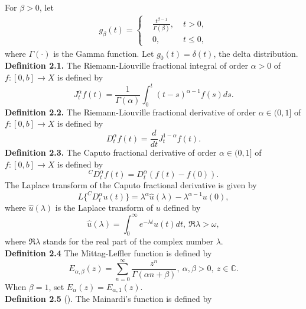 \documentclass[12pt,a4paper,oneside,reqno,notitlepage]{amsart}
\theoremstyle{plain}
\numberwithin{equation}{section}
\begin{document}
For $\beta>0$, let
\begin{eqnarray}
g_\beta(t)=\left\{\begin{aligned}
&\frac{t^{\beta-1}}{\Gamma(\beta)},\;&
t>0,\\
&0,\; &t\leq 0,
\end{aligned}\right.
\end{eqnarray}
where $\Gamma(\cdot)$ is the Gamma function. Let
$g_{0}(t)=\delta(t)$, the delta distribution.\\
\textbf{Definition 2.1.} The Riemann-Liouville fractional integral
of order $\alpha>0$ of $f:[0,b]\rightarrow X$ is defined by
\begin{equation}\label{0}
J_{t}^{\alpha}f(t)=\frac{1}{\Gamma(\alpha)}\int_{0}^{t}(t-s)^{\alpha-1}f(s)ds.
\end{equation}
\textbf{Definition 2.2.} The Riemann-Liouville fractional derivative
of order $\alpha\in (0,1]$ of $f:[0,b]\rightarrow X$ is defined by
\begin{equation}\label{ft}
D_{t}^{\alpha}f(t)=\frac{d}{dt}J_t^{1-\alpha}f(t).
\end{equation}
\textbf{Definition 2.3.} The Caputo fractional derivative
of order $\alpha\in (0,1]$ of $f:[0,b]\rightarrow X$ is defined by
\begin{equation}\label{dt}
^{C}D_{t}^{\alpha}f(t)=D_{t}^{\alpha}(f(t)-f(0)).
\end{equation}
The Laplace transform of the Caputo fractional
derivative is given by
\begin{equation}\label{laplace}
L\{^{C}D_{t}^{\alpha}u(t)\}=\lambda^{\alpha}\hat{u}(\lambda)-\lambda^{\alpha-1}u(0),
\end{equation}
where $\hat{u}(\lambda)$ is the Laplace transform of $u$ defined by
\begin{equation}\label{cute}
\hat{u}(\lambda)=\int_{0}^{\infty}e^{-\lambda t}u(t)dt,\
\mathfrak{R}\lambda>\omega,
\end{equation}
where $\mathfrak{R}\lambda$ stands for the real part of the complex number
$\lambda$.\\
\textbf{Definition 2.4}  The Mittag-Leffler function
 is defined by
\begin{equation}\label{ML}
E_{\alpha,\beta}(z)=\sum_{n=0}^{\infty}\frac{z^{n}}{\Gamma(\alpha
n+\beta)},\ \alpha,\beta>0,\ z\in \mathbb{C}.
\end{equation}
When $\beta=1$, set $E_{\alpha}(z)=E_{\alpha,1}(z)$. \\
\textbf{Definition 2.5} (\cite{Igor}). The Mainardi's function is defined by
\end{document}
